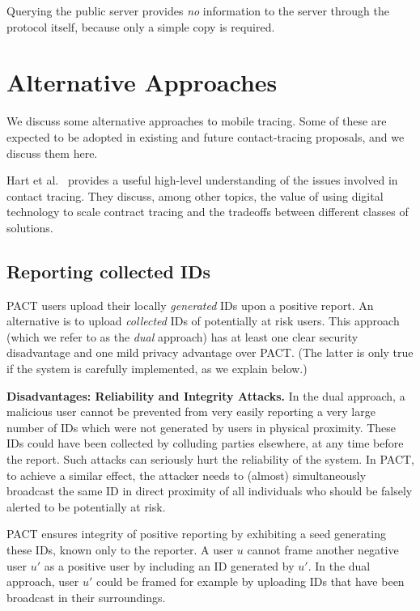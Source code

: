 \documentclass{article}
\begin{document}
Querying the public server provides \emph{no} information to the server through the protocol itself, because only a simple copy is required.  

\section{Alternative Approaches}\label{sec:alt}

We discuss some alternative approaches to mobile tracing. Some of these are expected to be adopted in existing and future contact-tracing proposals, and we discuss them here. 

Hart et al.~\cite{vihart} provides a useful high-level understanding of the issues involved in contact tracing. They discuss, among other topics, the value of using digital technology to scale contract tracing and the tradeoffs between different classes of solutions.

\subsection{Reporting collected IDs}
\label{sec:dual}

PACT users upload their locally {\em generated} IDs upon a positive report. An alternative is to upload {\em collected} IDs of potentially at risk users. This approach (which we refer to as the {\em dual} approach) has at least one clear security disadvantage and one mild privacy advantage over PACT. (The latter is only true if the system is carefully implemented, as we explain below.)

{\bf Disadvantages: Reliability and Integrity Attacks.} In the dual approach, a malicious user cannot be prevented from very easily reporting a very large number of IDs which were not generated by users in physical proximity. These IDs could have been collected by colluding parties elsewhere, at any time before the report. Such attacks can seriously hurt the reliability of the system. In PACT, to achieve a similar effect, the attacker needs to (almost) simultaneously broadcast the same ID in direct proximity of all individuals who should be falsely alerted to be potentially at risk. 

PACT ensures integrity of positive reporting by exhibiting a seed generating these IDs, known only to the reporter. A user $u$ cannot frame another negative user $u'$ as a positive user by including an ID generated by $u'$. In the dual approach, user $u'$ could be framed for example by uploading IDs that have been broadcast in their surroundings.  
\end{document}
